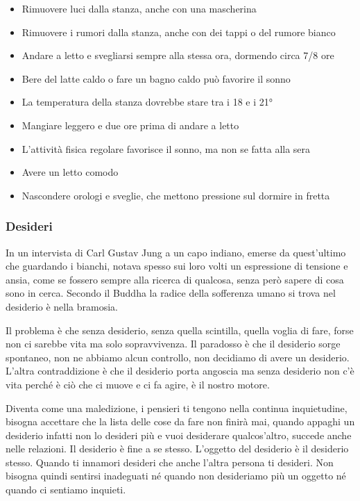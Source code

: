 \documentclass[12pt]{book} %
\begin{document}
\begin{mdframed}[linewidth=1pt]
\begin{itemize}
\item Rimuovere luci dalla stanza, anche con una mascherina
\item Rimuovere i rumori dalla stanza, anche con dei tappi o del rumore bianco
\item Andare a letto e svegliarsi sempre alla stessa ora, dormendo circa 7/8 ore
\item Bere del latte caldo o fare un bagno caldo può favorire il sonno
\item La temperatura della stanza dovrebbe stare tra i 18 e i 21°
\item Mangiare leggero e due ore prima di andare a letto
\item L'attività fisica regolare favorisce il sonno, ma non se fatta alla sera
\item Avere un letto comodo 
\item Nascondere orologi e sveglie, che mettono pressione sul dormire in fretta
\end{itemize}
\end{mdframed}

\bigskip

\subsubsection{Desideri}
In un intervista di Carl Gustav Jung a un capo indiano, emerse da quest'ultimo che guardando i
bianchi, notava spesso sui loro volti un espressione di tensione e ansia, come se fossero sempre alla ricerca di
qualcosa, senza però sapere di cosa sono in cerca. Secondo il Buddha la radice della sofferenza umano si trova nel
desiderio è nella bramosia.

Il problema è che senza desiderio, senza quella scintilla, quella voglia di fare, forse non ci sarebbe vita ma solo
sopravvivenza. Il paradosso è che il desiderio sorge spontaneo, non ne abbiamo alcun controllo, non decidiamo di avere
un desiderio. L'altra contraddizione è che il desiderio porta angoscia ma senza desiderio non c'è vita perché è ciò che
ci muove e ci fa agire, è il nostro motore. 

Diventa come una maledizione, i pensieri ti tengono nella continua inquietudine, bisogna accettare che la lista delle cose da fare non finirà mai, quando appaghi un desiderio infatti non lo desideri più e vuoi desiderare qualcos'altro, succede anche nelle relazioni. Il desiderio è fine a se stesso.
L'oggetto del desiderio è il desiderio stesso. Quando ti innamori desideri che anche
l'altra persona ti desideri. Non bisogna quindi sentirsi inadeguati né quando non desideriamo più
un oggetto né quando ci sentiamo inquieti.
\end{document}

